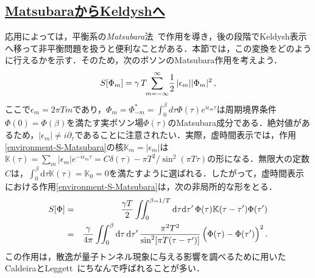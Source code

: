 \documentclass[a4paper,11pt]{ltjsarticle}
\newcommand{\subsectionlink}[1]{\subsection[#1]{\hyperlink{toc}{#1}}}
\def\d{\mathrm{d}}
\begin{document}
\subsectionlink{MatsubaraからKeldyshへ}\label{sec_environment-7}


応用によっては，平衡系の\emph{Matsubara}法~\cite{Matsubara,AGD}で作用を導き，後の段階でKeldysh表示へ移って非平衡問題を扱うと便利なことがある．本節では，この変換をどのように行えるかを示す．そのため，次のボソンのMatsubara作用を考えよう．
\begin{equation}\label{environment-S-Matsubara}
S[\Phi_m]=\gamma\, T\!\! \sum\limits_{m=-\infty}^\infty\!{1\over
2}\,  |\epsilon_m||\Phi_m|^2\, ,
\end{equation}ここで$\epsilon_m=2\pi T m$であり，$\Phi_m=\Phi_{-m}^*=\int_0^{\beta}
d\tau \Phi(\tau) e^{i\epsilon_m \tau}$は周期境界条件$\Phi(0)=\Phi(\beta)$を満たす実ボソン場$\Phi(\tau)$のMatsubara成分である．絶対値があるため，$|\epsilon_m|\neq i\partial_\tau$であることに注意されたい．実際，虚時間表示では，作用\eqref{environment-S-Matsubara}の核$\mathbb{K}_{m}=|\epsilon_{m}|$は$\mathbb{K}(\tau)=\sum_{m}|\epsilon_m|e^{-i\epsilon_{m}\tau}=C\delta(\tau)-\pi
T^2/\sin^{2}(\pi T\tau)$の形になる．無限大の定数$C$は，$\int^{\beta}_{0}\d\tau\mathbb{K}(\tau)=\mathbb{K}_0=0$を満たすように選ばれる．したがって，虚時間表示における作用\eqref{environment-S-Matsubara}は，次の非局所的な形をとる．
\begin{eqnarray}\label{environment-S-CL}
S[\Phi]&=&\frac{\gamma
T}{2}\iint^{\beta=1/T}_{0}\d\tau\d\tau'\,\Phi(\tau)\mathbb{K}(\tau-\tau')\Phi(\tau')
\nonumber\\
&=&{\gamma\over 4\pi}\iint_{0}^{\beta} \d\tau\, \d\tau' \,
\frac{\pi^2 T^2}{\sin^2[\pi T(\tau-\tau')]}
\,\Big(\Phi(\tau)-\Phi(\tau')\Big)^2\, .
\end{eqnarray}この作用は，散逸が量子トンネル現象に与える影響を調べるために用いたCaldeiraとLeggett~\cite{CaldeiraLeggett}にちなんで呼ばれることが多い．
\end{document}
